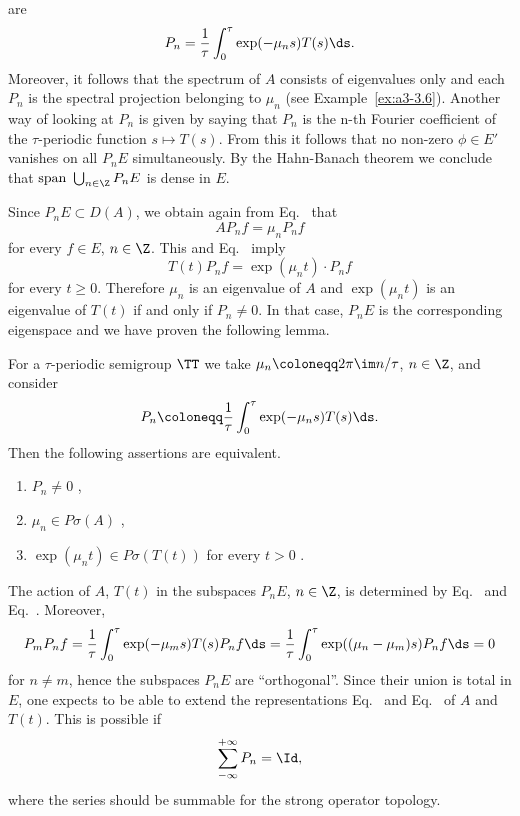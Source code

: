 are
\begin{equation}\label{eq:a3-5.2}
P_{n} = \frac{1}{\tau}\int_{0}^{\tau}\exp(-\mu_{n}s)T(s)  \ds .
\end{equation}
Moreover, it follows that the spectrum of\/ $A$ consists of eigenvalues only and each $P_{n}$ is the spectral projection belonging to $\mu_{n}$ (see Example~\ref{ex:a3-3.6}). 
Another way of looking at $P_{n}$ is given by saying that $P_{n}$ is the n-th Fourier coefficient of the $\tau$-periodic function $s \mapsto T(s)$.
From this it follows that no non-zero $\phi \in E'$ vanishes on all $P_{n}E$ simultaneously.
By the Hahn-Banach theorem we conclude that $\text{span } \bigcup_{n \in \Z} P_{n}E$ is dense in $E$.

Since $P_{n}E \subset D(A)$, we obtain again from Eq.~ that
\begin{equation}\label{eq:a3-5.3}
AP_{n}f = \mu_{n}P_{n}f
\end{equation}
for every $f \in E$, $n \in \Z$.
This and Eq.~ imply
\begin{equation}\label{eq:a3-5.4}
T(t)P_{n}f = \exp(\mu_{n}t) \cdot P_{n}f
\end{equation}
for every $t \geq 0$.
Therefore $\mu_{n}$ is an eigenvalue of\/ $A$ and $\exp(\mu_{n}t)$ is an eigenvalue of\/ $T(t)$ if and only if\/ $P_{n} \neq 0$.
In that case, $P_{n}E$ is the corresponding eigenspace and we have proven the following lemma.
\begin{lemma}\label{lem:a3-5.3}
For a $\tau$-periodic semigroup $\TT$ we take $\mu_{n} \coloneqq 2\pi\im n/\tau$, $n \in \Z$, and consider
\[
P_{n} \coloneqq \frac{1}{\tau}\int_{0}^{\tau} \exp(-\mu_{n}s)T(s)  \ds .
\]
Then the following assertions are equivalent.
\begin{enumerate}[\upshape (a)]
\item 
$P_{n} \neq 0$ ,

\item 
$\mu_{n} \in P\sigma(A)$ ,

\item 
$\exp(\mu_{n}t) \in P\sigma(T(t))$ for every $t > 0$ .

\end{enumerate}
\end{lemma}
The action of\/ $A$, \resp $T(t)$ in the subspaces $P_{n}E$, $n \in \Z$, is determined by Eq.~ and Eq.~.
Moreover,
\[
	P_{m}P_{n}f =  \frac{1}{\tau}\int_{0}^{\tau} \exp(-\mu_{m}s)T(s)P_{n}f  \ds 
	=  \frac{1}{\tau}\int_{0}^{\tau} \exp((\mu_{n}-\mu_{m})s)P_{n}f  \ds = 0
\]
for $n \neq m$, hence the subspaces $P_{n}E$ are \enquote{orthogonal}.
Since their union is total in $E$, one expects to be able to extend the representations Eq.~ and Eq.~ of\/ $A$ and $T(t)$.
This is possible if
\[
	\sum_{-\infty}^{+\infty} P_{n} = \Id ,
\]
where the series should be summable for the strong operator topology.


